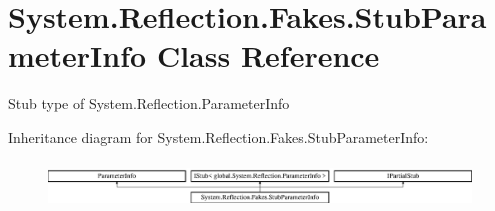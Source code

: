 \hypertarget{class_system_1_1_reflection_1_1_fakes_1_1_stub_parameter_info}{\section{System.\-Reflection.\-Fakes.\-Stub\-Parameter\-Info Class Reference}
\label{class_system_1_1_reflection_1_1_fakes_1_1_stub_parameter_info}
}


Stub type of System.\-Reflection.\-Parameter\-Info 


Inheritance diagram for System.\-Reflection.\-Fakes.\-Stub\-Parameter\-Info\-:\begin{figure}[H]
\begin{center}
\leavevmode
\includegraphics[height=1.274175cm]{class_system_1_1_reflection_1_1_fakes_1_1_stub_parameter_info}
\end{center}
\end{figure}
